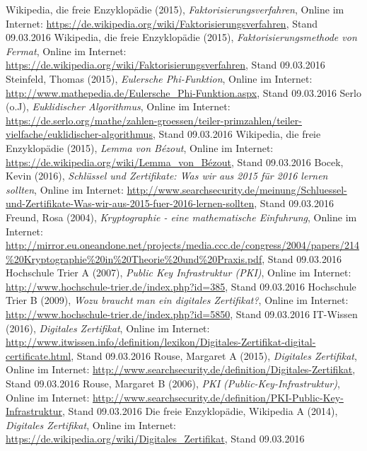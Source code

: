 \documentclass[a4paper, fontsize=12pt, parskip=full, toc=bibliographynumbered]{scrreprt}
\begin{document}
\begin{thebibliography}{9}
 Wikipedia, die freie Enzyklopädie (2015), \emph{Faktorisierungsverfahren}, Online im Internet: \url{https://de.wikipedia.org/wiki/Faktorisierungsverfahren}, Stand 09.03.2016
 Wikipedia, die freie Enzyklopädie (2015), \emph{Faktorisierungsmethode von Fermat}, Online im Internet: \url{https://de.wikipedia.org/wiki/Faktorisierungsverfahren}, Stand 09.03.2016
 Steinfeld, Thomas (2015), \emph{Eulersche Phi-Funktion}, Online im Internet: \url{http://www.mathepedia.de/Eulersche_Phi-Funktion.aspx}, Stand 09.03.2016
 Serlo (o.J), \emph{Euklidischer Algorithmus}, Online im Internet: \url{https://de.serlo.org/mathe/zahlen-groessen/teiler-primzahlen/teiler-vielfache/euklidischer-algorithmus}, Stand 09.03.2016
 Wikipedia, die freie Enzyklopädie (2015), \emph{Lemma von Bézout}, Online im Internet: \url{https://de.wikipedia.org/wiki/Lemma_von_Bézout}, Stand 09.03.2016
 Bocek, Kevin (2016), \emph{Schlüssel und Zertifikate: Was wir aus 2015 für 2016 lernen sollten}, Online im Internet: \url{http://www.searchsecurity.de/meinung/Schluessel-und-Zertifikate-Was-wir-aus-2015-fuer-2016-lernen-sollten}, Stand 09.03.2016
 Freund, Rosa (2004), \emph{Kryptographie - eine mathematische Einfuhrung}, Online im Internet: \url{http://mirror.eu.oneandone.net/projects/media.ccc.de/congress/2004/papers/214%20Kryptographie%20in%20Theorie%20und%20Praxis.pdf}, Stand 09.03.2016
 Hochschule Trier A (2007), \emph{Public Key Infrastruktur (PKI)}, Online im Internet: \url{http://www.hochschule-trier.de/index.php?id=385}, Stand 09.03.2016
 Hochschule Trier B (2009), \emph{Wozu braucht man ein digitales Zertifikat?}, Online im Internet: \url{http://www.hochschule-trier.de/index.php?id=5850}, Stand 09.03.2016
 IT-Wissen (2016), \emph{Digitales Zertifikat}, Online im Internet: \url{http://www.itwissen.info/definition/lexikon/Digitales-Zertifikat-digital-certificate.html}, Stand 09.03.2016
 Rouse, Margaret A (2015), \emph{Digitales Zertifikat}, Online im Internet: \url{http://www.searchsecurity.de/definition/Digitales-Zertifikat}, Stand 09.03.2016
 Rouse, Margaret B (2006), \emph{PKI (Public-Key-Infrastruktur)}, Online im Internet: \url{http://www.searchsecurity.de/definition/PKI-Public-Key-Infrastruktur}, Stand 09.03.2016
 Die freie Enzyklopädie, Wikipedia A (2014), \emph{Digitales Zertifikat}, Online im Internet: \url{https://de.wikipedia.org/wiki/Digitales_Zertifikat}, Stand 09.03.2016

\end{thebibliography}
\end{document}
